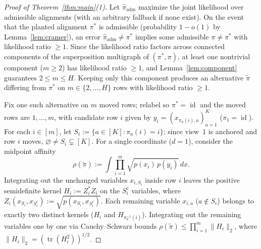 \documentclass[11pt]{article}
\theoremstyle{plain}
\theoremstyle{definition}
\theoremstyle{remark}
\DeclareMathOperator{\tr}{tr}
\DeclareMathOperator{\id}{id}
\begin{document}
\begin{proof}[Proof of Theorem~\ref{thm:main}\textup{(1)}]
Let $\widehat{\pi}_{\mathrm{adm}}$ maximize the joint likelihood over admissible alignments (with an arbitrary fallback if none exist).
On the event that the planted alignment $\pi^*$ is admissible (probability $1 - o(1)$ by Lemma~\ref{lem:cramer}), an error $\widehat{\pi}_{\mathrm{adm}} \neq \pi^*$ implies some admissible $\pi \neq \pi^*$ with likelihood ratio $\ge 1$.
Since the likelihood ratio factors across connected components of the superposition multigraph of $(\pi^*, \pi)$, at least one nontrivial component ($m \ge 2$) has likelihood ratio $\ge 1$, and Lemma~\ref{lem:component} guarantees $2 \le m \le H$.
Keeping only this component produces an alternative $\tilde{\pi}$ differing from $\pi^*$ on $m \in \{2, \dots, H\}$ rows with likelihood ratio $\ge 1$.

Fix one such alternative on $m$ moved rows; relabel so $\pi^* = \id$ and the moved rows are $1, \dots, m$, with candidate row $i$ given by $y_i = (x_{\pi_a(i), a})_{a=1}^K$ ($\pi_1 = \id$).
For each $i \in [m]$, let $S_i := \{a \in [K] : \pi_a(i) = i\}$; since view~$1$ is anchored and row $i$ moves, $\varnothing \neq S_i \subsetneq [K]$.
For a single coordinate ($d = 1$), consider the midpoint affinity
\[
\rho(\tilde{\pi}) := \int \prod_{i=1}^m \sqrt{p(x_i)\,p(y_i)}\,dx.
\]
Integrating out the unchanged variables $x_{i, S_i}$ inside row $i$ leaves the positive semidefinite kernel $H_i := Z_i^* Z_i$ on the $S_i^c$ variables, where $Z_i(x_{S_i}, x_{S_i^c}) := \sqrt{p(x_{S_i}, x_{S_i^c})}$.
Each remaining variable $x_{i, a}$ ($a \notin S_i$) belongs to exactly two distinct kernels ($H_i$ and $H_{\pi_a^{-1}(i)}$).
Integrating out the remaining variables one by one via Cauchy--Schwarz bounds $\rho(\tilde{\pi}) \le \prod_{i=1}^m \|H_i\|_2$, where $\|H_i\|_2 = (\tr(H_i^2))^{1/2}$.


\end{proof}
\end{document}
